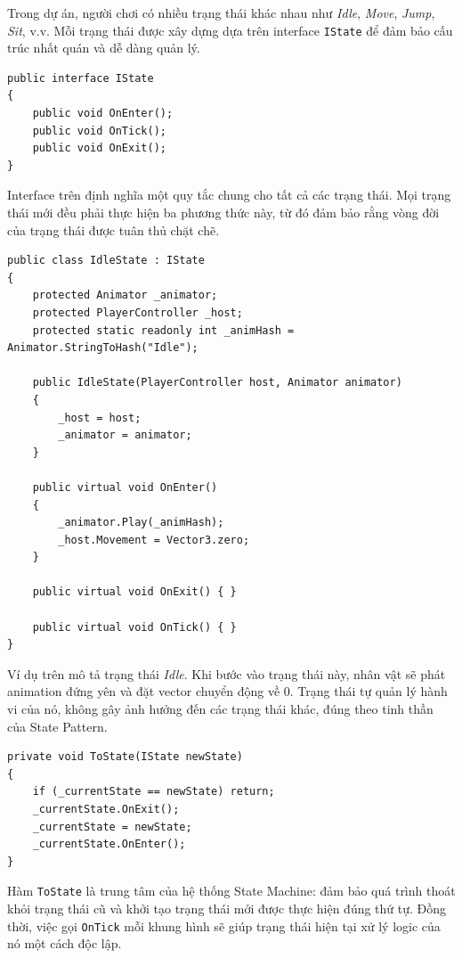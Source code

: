 Trong dự án, người chơi có nhiều trạng thái khác nhau như \textit{Idle}, \textit{Move}, \textit{Jump}, \textit{Sit}, v.v. Mỗi trạng thái được xây dựng dựa trên interface \texttt{IState} để đảm bảo cấu trúc nhất quán và dễ dàng quản lý.

\newpage 
\begin{lstlisting}[style=csharpstyle, caption={Interface IState trong dự án}]
public interface IState
{
    public void OnEnter();
    public void OnTick();
    public void OnExit();
}
\end{lstlisting}

Interface trên định nghĩa một quy tắc chung cho tất cả các trạng thái. Mọi trạng thái mới đều phải thực hiện ba phương thức này, từ đó đảm bảo rằng vòng đời của trạng thái được tuân thủ chặt chẽ.

\begin{lstlisting}[style=csharpstyle, caption={Ví dụ: IdleState}]
public class IdleState : IState
{
    protected Animator _animator;
    protected PlayerController _host;   
    protected static readonly int _animHash = Animator.StringToHash("Idle");

    public IdleState(PlayerController host, Animator animator)
    {
        _host = host;
        _animator = animator;
    }

    public virtual void OnEnter()
    {
        _animator.Play(_animHash);
        _host.Movement = Vector3.zero;
    }

    public virtual void OnExit() { }

    public virtual void OnTick() { }
}
\end{lstlisting}

Ví dụ trên mô tả trạng thái \textit{Idle}. Khi bước vào trạng thái này, nhân vật sẽ phát animation đứng yên và đặt vector chuyển động về 0. Trạng thái tự quản lý hành vi của nó, không gây ảnh hưởng đến các trạng thái khác, đúng theo tinh thần của State Pattern.

\begin{lstlisting}[style=csharpstyle, caption={Hàm chuyển trạng thái trong State Machine}]
private void ToState(IState newState)
{
    if (_currentState == newState) return;
    _currentState.OnExit();
    _currentState = newState;
    _currentState.OnEnter();
}
\end{lstlisting}

Hàm \texttt{ToState} là trung tâm của hệ thống State Machine: đảm bảo quá trình thoát khỏi trạng thái cũ và khởi tạo trạng thái mới được thực hiện đúng thứ tự. Đồng thời, việc gọi \texttt{OnTick} mỗi khung hình sẽ giúp trạng thái hiện tại xử lý logic của nó một cách độc lập.

